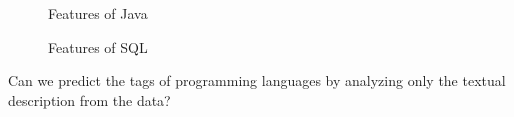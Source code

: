 \documentclass[letterpaper, 10 pt, conference]{ieeeconf}  %
\begin{document}
\begin{figure}[t]
    \centering
    \qquad
    \caption{Features of Java }%
    \label{fig:Java}%
\end{figure}
\begin{figure}[t]
    \centering
    \qquad
    \caption{Features of SQL}%
    \label{fig:SQL}%
\end{figure}



\begin{res}
Can we predict the tags of programming languages by analyzing only the textual description from the data?
\end{res}
 
\end{document}

